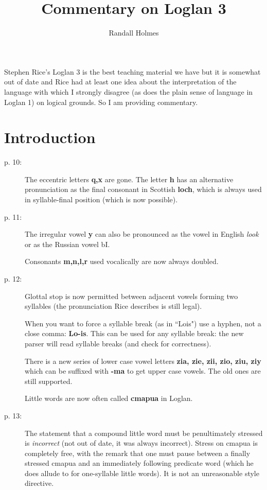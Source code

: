 \documentclass[12pt]{article}
\title{Commentary on Loglan 3}
\author{Randall Holmes}
\begin{document}
\maketitle

Stephen Rice's Loglan 3 is the best teaching material we have but it is somewhat out of date and Rice had at least one idea about the interpretation of the language with which I strongly disagree (as does the plain sense of language in Loglan 1) on logical grounds.  So I am providing commentary.

\section{Introduction}

\begin{description}

\item[p. 10:]  The eccentric letters {\bf q,x} are gone.  The letter {\bf h} has an alternative pronunciation as the final consonant in Scottish {\bf loch}, which is always used in syllable-final position (which is now possible).

\item[p. 11:] The irregular vowel {\bf y} can also be pronounced as the vowel in English {\em look\/} or as the Russian vowel bI.

Consonants {\bf m,n,l,r} used vocalically are now always doubled.

\item[p. 12:]  Glottal stop is now permitted between adjacent vowels forming two syllables (the pronunciation Rice describes is still legal).

When you want to force a syllable break (as in ``Lois") use a hyphen, not a close comma:  {\bf Lo-is}.  This can be used for any syllable break:  the new parser will read syllable breaks (and check for correctness).

There is a new series of lower case vowel letters {\bf zia, zie, zii, zio, ziu, ziy} which can be suffixed with {\bf -ma} to get upper case vowels.  The old ones are still supported.

Little words are now often called {\bf cmapua} in Loglan.

\item[p. 13:]  The statement that a compound little word must be penultimately stressed is {\em incorrect\/} (not out of date, it was always incorrect).  Stress on cmapua is completely free, with the remark that one must pause between a finally stressed cmapua and an immediately following predicate word (which he does allude to for one-syllable little words).  It is not an unreasonable style directive.


\end{description}
\end{document}
